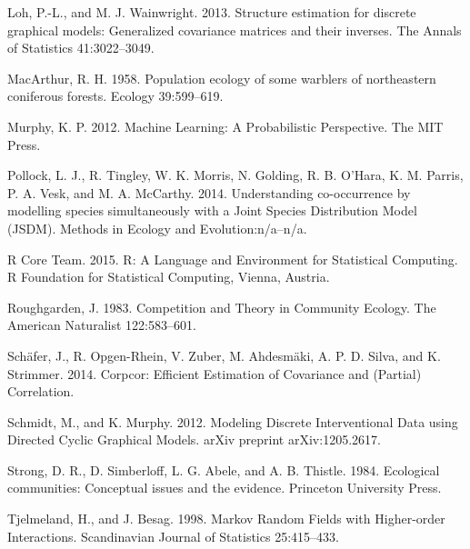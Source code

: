 \documentclass[12pt,]{article}
\begin{document}
\begin{spacing}{1.9}
\begin{flushleft}
Loh, P.-L., and M. J. Wainwright. 2013. Structure estimation for
discrete graphical models: Generalized covariance matrices and their
inverses. The Annals of Statistics 41:3022--3049.

MacArthur, R. H. 1958. Population ecology of some warblers of
northeastern coniferous forests. Ecology 39:599--619.

Murphy, K. P. 2012. Machine Learning: A Probabilistic Perspective. The
MIT Press.

Pollock, L. J., R. Tingley, W. K. Morris, N. Golding, R. B. O'Hara, K.
M. Parris, P. A. Vesk, and M. A. McCarthy. 2014. Understanding
co-occurrence by modelling species simultaneously with a Joint Species
Distribution Model (JSDM). Methods in Ecology and Evolution:n/a--n/a.

R Core Team. 2015. R: A Language and Environment for Statistical
Computing. R Foundation for Statistical Computing, Vienna, Austria.

Roughgarden, J. 1983. Competition and Theory in Community Ecology. The
American Naturalist 122:583--601.

Schäfer, J., R. Opgen-Rhein, V. Zuber, M. Ahdesmäki, A. P. D. Silva, and
K. Strimmer. 2014. Corpcor: Efficient Estimation of Covariance and
(Partial) Correlation.

Schmidt, M., and K. Murphy. 2012. Modeling Discrete Interventional Data
using Directed Cyclic Graphical Models. arXiv preprint arXiv:1205.2617.

Strong, D. R., D. Simberloff, L. G. Abele, and A. B. Thistle. 1984.
Ecological communities: Conceptual issues and the evidence. Princeton
University Press.

Tjelmeland, H., and J. Besag. 1998. Markov Random Fields with
Higher-order Interactions. Scandinavian Journal of Statistics
25:415--433.


\end{flushleft}
\end{spacing}
\end{document}
